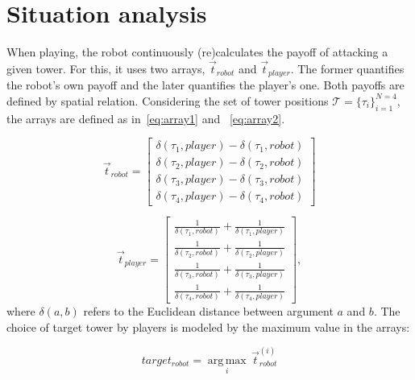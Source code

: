 \section{Situation analysis}\label{sec:deception_detecting_it}
When playing, the robot continuously (re)calculates the payoff of attacking a given tower. For this, it uses two arrays, $\overrightarrow{t}_{robot}$ and $\overrightarrow{t}_{player}$. The former quantifies the robot's own payoff and the later quantifies the player's one. Both payoffs are defined by spatial relation. Considering the set of tower positions $\mathcal{T} = \{\tau_{i}\}_{i=1}^{N=4}$, the arrays are defined as in~\ref{eq:array1} and ~\ref{eq:array2}.

\begin{equation}
    \overrightarrow{t}_{robot} = \begin{bmatrix}
    \delta(\tau_{1},player) -\delta(\tau_{1},robot)  \\ 
    \delta(\tau_{2},player) - \delta(\tau_{2},robot)  \\
    \delta(\tau_{3},player) - \delta(\tau_{3},robot) \\
    \delta(\tau_{4},player) - \delta(\tau_{4},robot)
    \end{bmatrix}
    \label{eq:array1}
\end{equation}

\begin{equation}
\overrightarrow{t}_{player} = \begin{bmatrix}
\frac{1}{\delta(\tau_{1},robot)} + \frac{1}{\delta(\tau_{1},player)} \\ 
\frac{1}{\delta(\tau_{2},robot)} + \frac{1}{\delta(\tau_{2},player)}  \\
\frac{1}{\delta(\tau_{3},robot)} + \frac{1}{\delta(\tau_{3},player)}  \\
\frac{1}{\delta(\tau_{4},robot)} + \frac{1}{\delta(\tau_{4},player)} 
\end{bmatrix},
\label{eq:array2}
\end{equation}
where $\delta(a,b)$ refers to the Euclidean distance between argument $a$ and $b$. The choice of target tower by players is modeled by the maximum value in the arrays:

\begin{equation} \label{eq:best_t_robot}
    target_{robot} = \operatorname*{arg\,max}_i \, \overrightarrow{t}^{(i)}_{robot} 
\end{equation}

